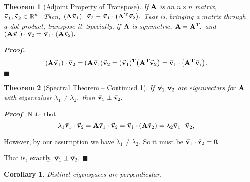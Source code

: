 \documentclass[12pt, a4paper]{article}
\newtheorem{thm}{Theorem}[subsection]
\newtheorem{cor}{Corollary}[section]
\newenvironment*{prf}{\par\indent\textbf{\textit{Proof. }}}{\hfill $\blacksquare$\par}
\def\R{{\mathbb{R}}}
\def\T{{\vb{T}}}
\def\vecv{\va{v}}
\def\matrixA{\vb{A}}
\begin{document}
\begin{thm}[Adjoint Property of Transpose]
	If $\matrixA$ is an $n\times n$ matrix, $\vecv_1,\vecv_2\in\R^n.$ Then, $\qty(\matrixA\vecv_1)\cdot\vecv_2=\vecv_1\cdot\qty(\matrixA^\T\vecv_2).$ That is, bringing a matrix through a dot product, transpose it. Specially, if $\matrixA$ is symmetric, $\matrixA=\matrixA^\T,$ and $\qty(\matrixA\vecv_1)\cdot\vecv_2=\vecv_1\cdot\qty(\matrixA\vecv_2).$
\end{thm}
\begin{prf}
	\[\qty(\matrixA\vecv_1)\cdot\vecv_2=\qty(\matrixA\vecv_1)\vecv_2=(\vecv_1)^\T\qty(\matrixA^\T\vecv_2)=\vecv_1\cdot\qty(\matrixA^\T\vecv_2).\]	
\end{prf}
\begin{thm}[Spectral Theorem -- Continued 1]
	If $\vecv_1,\vecv_2$ are eigenvectors for $\matrixA$ with eigenvalues $\lambda_1\neq\lambda_2,$ then $\vecv_1\perp\vecv_2.$	
\end{thm}
\begin{prf}
	Note that \[\lambda_1\vecv_1\cdot\vecv_2=\matrixA\vecv_1\cdot\vecv_2=\vecv_1\cdot\qty(\matrixA\vecv_2)=\lambda_2\vecv_1\cdot\vecv_2,\]\par  However, by our assumption we have $\lambda_1\neq\lambda_2.$ So it must be $\vecv_1\cdot\vecv_2=0.$\par That is, exactly, $\vecv_1\perp\vecv_2.$
\end{prf}
\begin{cor}
	Distinct eigenspaces are perpendicular. 	
\end{cor}
\end{document}

